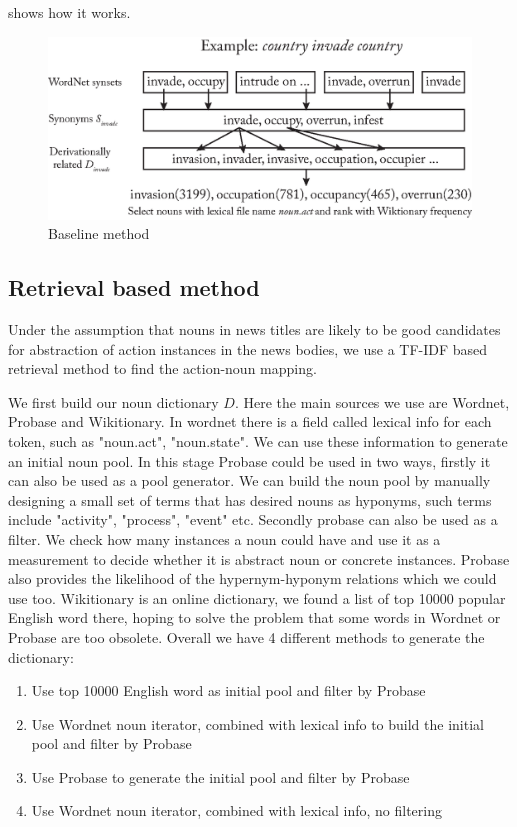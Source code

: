  shows how it works. 
 


\begin{figure}[h]
\includegraphics[width=0.95\linewidth]{img/baseline}
\caption{Baseline method}
\label{fig:baseline}
\end{figure}

\subsection{Retrieval based method}

Under the assumption that nouns in news titles are likely to be good candidates
for abstraction of action instances in the news bodies, we use a TF-IDF based retrieval method
to find the action-noun mapping.

We first build our noun dictionary $D$. Here the main sources we use are Wordnet, 
Probase and Wikitionary. In wordnet there is a field called lexical info for each token,
such as "noun.act", "noun.state". We can use these information to generate an
initial noun pool. In this stage Probase could be used in two ways, firstly it
can also be used as a pool generator. We can build the noun pool by manually designing
a small set of terms that has desired nouns as hyponyms, such terms include "activity",
"process", "event" etc. Secondly probase can also be used as a filter. We check how 
many instances a noun could have and use it as a measurement to decide whether it 
is abstract noun or concrete instances. Probase also provides the likelihood of 
the hypernym-hyponym relations which we could use too. Wikitionary is an online 
dictionary, we found a list of top 10000 popular English word there, hoping to 
solve the problem that some words in Wordnet or Probase are too obsolete.
Overall we have 4 different methods to generate the dictionary:
\begin{enumerate}
\item Use top 10000 English word as initial pool and filter by Probase
\item Use Wordnet noun iterator, combined with lexical info to build the initial pool and filter by Probase
\item Use Probase to generate the initial pool and filter by Probase
\item Use Wordnet noun iterator, combined with lexical info, no filtering
\end{enumerate}

